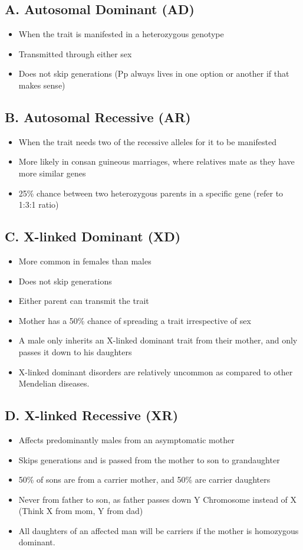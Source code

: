 \documentclass{article}
\begin{document}
\subsection*{A. Autosomal Dominant (AD)}
\begin{itemize}
    \item When the trait is manifested in a heterozygous genotype
    \item Transmitted through either sex
    \item Does not skip generations (Pp always lives in one option or another if that makes sense)
\end{itemize}
\subsection*{B. Autosomal Recessive (AR)}
\begin{itemize}
    \item When the trait needs two of the recessive alleles for it to be manifested
    \item More likely in consan guineous marriages, where relatives mate as they have more similar genes
    \item 25\% chance between two heterozygous parents in a specific gene (refer to 1:3:1 ratio)
\end{itemize}
\subsection*{C. X-linked Dominant (XD)}
\begin{itemize}
    \item More common in females than males
    \item Does not skip generations
    \item Either parent can transmit the trait
    \item Mother has a 50\% chance of spreading a trait irrespective of sex 
    \item A male only inherits an X-linked dominant trait from their mother, and only passes it down to his daughters
    \item X-linked dominant disorders are relatively uncommon as compared to other
    Mendelian diseases.
\end{itemize}
\subsection*{D. X-linked Recessive (XR)}
\begin{itemize}
    \item Affects predominantly males from an asymptomatic mother
    \item Skips generations and is passed from the mother to son to grandaughter
    \item 50\% of sons are from a carrier mother, and 50\% are carrier daughters
    \item Never from father to son, as father passes down Y Chromosome instead of X (Think X from mom, Y from dad)
    \item All daughters of an affected man will be carriers if the mother is
    homozygous dominant.
\end{itemize}
\end{document}
